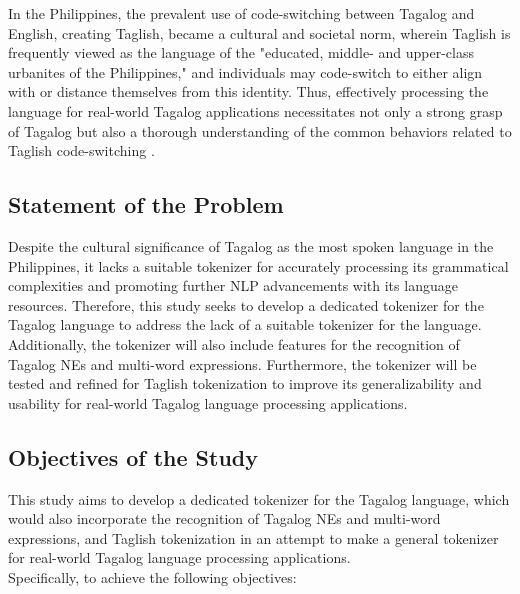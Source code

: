 \documentclass[journal]{./IEEE/IEEEtran}
\begin{document}
In the Philippines, the prevalent use of code-switching between Tagalog and English, creating Taglish, became a cultural and societal norm, wherein Taglish is frequently viewed as the language of the "educated, middle- and upper-class urbanites of the Philippines," and individuals may code-switch to either align with or distance themselves from this identity.  Thus, effectively processing the language for real-world Tagalog applications necessitates not only a strong grasp of Tagalog but also a thorough understanding of the common behaviors related to Taglish code-switching {\cite{TweetTaglish}}. \\

\newpage

\subsection{Statement of the Problem}

Despite the cultural significance of Tagalog as the most spoken language in the Philippines, it lacks a suitable tokenizer for accurately processing its grammatical complexities and promoting further NLP advancements with its language resources. Therefore, this study seeks to develop a dedicated tokenizer for the Tagalog language to address the lack of a suitable tokenizer for the language. Additionally, the tokenizer will also include features for the recognition of Tagalog NEs and multi-word expressions. Furthermore, the tokenizer will be tested and refined for Taglish tokenization to improve its generalizability and usability for real-world Tagalog language processing applications.

\subsection{Objectives of the Study}

This study aims to develop a dedicated tokenizer for the Tagalog language, which would also incorporate the recognition of Tagalog NEs and multi-word expressions, and Taglish tokenization in an attempt to make a general tokenizer for real-world Tagalog language processing applications. \\

Specifically, to achieve the following objectives: \\
\end{document}
